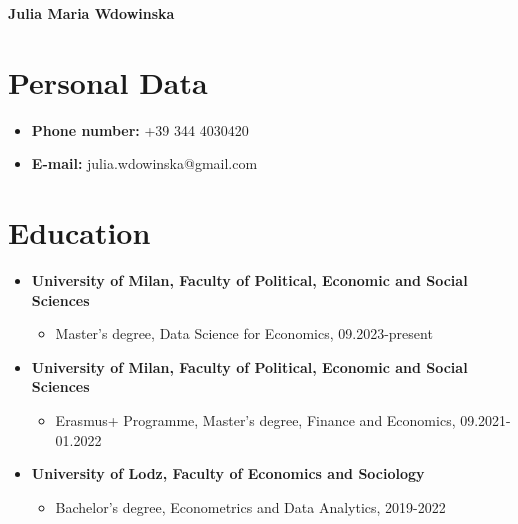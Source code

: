 \documentclass[a4paper,10pt]{article}
\begin{document}
\begin{center}
    \textbf{\LARGE Julia Maria Wdowinska}
\end{center}

\section*{Personal Data}
\begin{itemize}[label=]
    \item \textbf{Phone number:} +39 344 4030420
    \item \textbf{E-mail:} julia.wdowinska@gmail.com
\end{itemize}

\section*{Education}
\begin{itemize}
    \item \textbf{University of Milan, Faculty of Political, Economic and Social Sciences}
    \begin{itemize}
        \item Master's degree, Data Science for Economics, 09.2023-present
    \end{itemize}
    \item \textbf{University of Milan, Faculty of Political, Economic and Social Sciences}
    \begin{itemize}
        \item Erasmus+ Programme, Master's degree, Finance and Economics, 09.2021-01.2022
    \end{itemize}
    \item \textbf{University of Lodz, Faculty of Economics and Sociology}
    \begin{itemize}
        \item Bachelor's degree, Econometrics and Data Analytics, 2019-2022
    \end{itemize}
\end{itemize}
\end{document}
